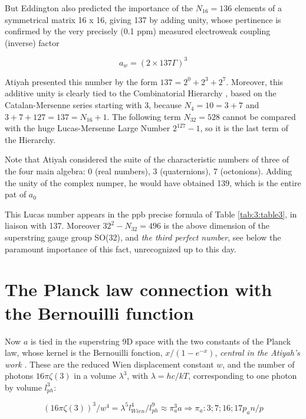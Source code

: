 \documentclass[a4paper,9pt]{article}
\begin{document}
But Eddington also predicted the importance of the $N_{16} = 136$ elements of a symmetrical matrix 16 x 16, giving 137 by adding unity, whose pertinence is confirmed by the very precisely (0.1 ppm) measured electroweak coupling (inverse) factor 

\begin{equation}
a_w = (2\times137 \Gamma)^3
\end{equation}
 
Atiyah presented this number by the form $137 = 2^0 + 2^3 + 2^7$. Moreover, this additive unity is clearly tied to the Combinatorial Hierarchy \cite{Bastin}, based on the Catalan-Mersenne series starting with 3, because $N_4 = 10 = 3 + 7$ and $3+7 + 127 = 137 = N_{16} + 1$. The following term $N_{32}  = 528$ cannot be compared with the huge Lucas-Mersenne Large Number $2^{127}- 1$, so it is the last term of the Hierarchy.


Note that Atiyah considered the suite of the characteristic numbers of three of the four main algebra: 0 (real numbers), 3 (quaternions), 7 (octonions). Adding the unity of the complex numper, he would have obtained 139, which is the entire pat of $a_0$ 

This Lucas number appears in the ppb precise formula of Table \ref{tab:3:table3}, in liaison with 137. Moreover $32^2 - N_{32} =  496$ is the above dimension of the superstring gauge group SO(32), and \textit {the third perfect number}, see below the paramount importance of this fact, unrecognized up to this day.









\section{The Planck law connection with the Bernouilli function}

Now $a$ is tied in the superstring 9D space with the two constants of the Planck law, whose kernel is the Bernouilli fonction, $x/(1-e^{-x})$, \textit {central in the Atiyah's work} \cite{Atiyah}. These are the reduced Wien displacement constant $w$, and the number of photons $16\pi \zeta(3)$ in a volume $\lambda^3$, with $\lambda = hc/kT $, corresponding to one photon by volume $l_{ph}^3$:

\begin{equation}
(16\pi\zeta(3))^3/w^4 = \lambda^5l_{Wien}^4/l_{ph}^9 \approx \pi_a^3a    \Rightarrow     \pi_a: 3;7;16;17p_an/p
\end{equation}
\end{document}
